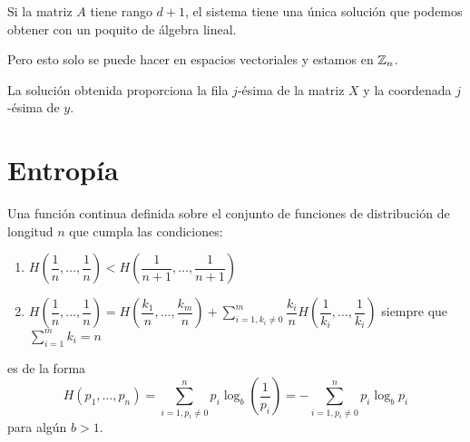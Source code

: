 Si la matriz $A$ tiene rango $d+1$, el sistema tiene una única solución que podemos obtener con un poquito de álgebra lineal. \begin{reader}
    Pero esto solo se puede hacer en espacios vectoriales y estamos en $\mathbb{Z}_n$.
\end{reader}

La solución obtenida proporciona la fila $j$-ésima de la matriz $X$ y la coordenada $j$-ésima de $y$.
\section{Entropía}

\begin{teo}
    Una función continua definida sobre el conjunto de funciones de distribución de longitud $n$ que cumpla las condiciones:

    \begin{enumerate}[label=(\arabic*)]
        \item\label{item:l1-i1} $H\left(\dfrac{1}{n},\dots,\dfrac{1}{n}\right) < H\left(\dfrac{1}{n+1},\dots,\dfrac{1}{n+1}\right)$
        \item\label{item:l1-i2} $\displaystyle H\left(\dfrac{1}{n},\dots,\dfrac{1}{n}\right) = H\left(\dfrac{k_1}{n},\dots,\dfrac{k_m}{n}\right)+\sum_{i=1, k_i\neq 0}^m\dfrac{k_i}{n}H\left(\dfrac{1}{k_i},\dots,\dfrac{1}{k_i}\right)$ siempre que $\displaystyle \sum_{i=1}^mk_i=n$
    \end{enumerate}
    es de la forma
    $$H(p_1,\dots,p_n)=\sum_{i=1, p_i\ne 0}^np_i\log_b\left(\dfrac{1}{p_i}\right)=-\sum_{i=1, p_i\ne 0}^np_i\log_bp_i$$
    para algún $b>1$. 
\end{teo}

